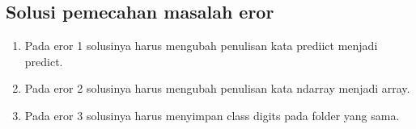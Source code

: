 \documentclass{article}
\begin{document}
\subsection{Solusi pemecahan masalah eror}
\begin{enumerate}
    \item Pada eror 1 solusinya harus mengubah penulisan kata prediict menjadi predict.
    \item Pada eror 2 solusinya harus mengubah penulisan kata ndarray menjadi array.
    \item Pada eror 3 solusinya harus menyimpan class digits pada folder yang sama.
\end{enumerate}
\end{document}
